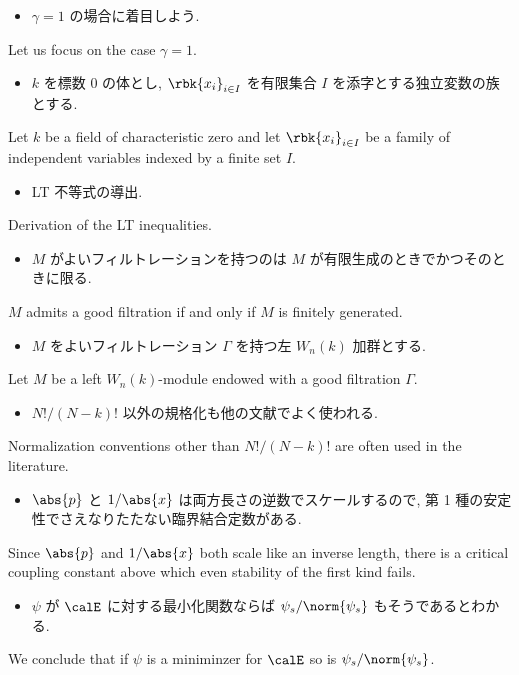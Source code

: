 \documentclass[openany, a4paper, oneside]{jsbook}
\begin{document}
\begin{itemize}
\item $\gamma = 1$ の場合に着目しよう. \cite{LiebSeiringer1}
\end{itemize}
Let us focus on the case $\gamma = 1$.

\begin{itemize}
\item $k$ を標数 $0$ の体とし, $\rbk{x_i}_{i \in I}$ を有限集合 $I$ を添字とする独立変数の族とする.
\end{itemize}
Let $k$ be a field of characteristic zero and let $\rbk{x_i}_{i \in I}$ be a family
of independent variables indexed by a finite set $I$.

\begin{itemize}
\item LT 不等式の導出. \cite{LiebSeiringer1}
\end{itemize}
Derivation of the LT inequalities.

\begin{itemize}
\item $M$ がよいフィルトレーションを持つのは $M$ が有限生成のときでかつそのときに限る.
\end{itemize}
$M$ admits a good filtration if and only if $M$ is finitely generated.

\begin{itemize}
\item $M$ をよいフィルトレーション $\Gamma$ を持つ左 $W_n (k)$ 加群とする.
\end{itemize}
Let $M$ be a left $W_n(k)$-module endowed with a good filtration $\Gamma$.

\begin{itemize}
\item $N!/(N-k)!$ 以外の規格化も他の文献でよく使われる. \cite{LiebSeiringer1}
\end{itemize}
Normalization conventions other than $N!/(N-k)!$ are often used in the literature.

\begin{itemize}
\item $\abs{p}$ と $1 / \abs{x}$ は両方長さの逆数でスケールするので, 第 1 種の安定性でさえなりたたない臨界結合定数がある. \cite{LiebSeiringer1}
\end{itemize}
Since $\abs{p}$ and $1 / \abs{x}$ both scale like an inverse length, there is a critical
coupling constant above which even stability of the first kind fails.

\begin{itemize}
\item $\psi$ が $\calE$ に対する最小化関数ならば $\psi_{s} / \norm{\psi_s}$ もそうであるとわかる. \cite{LiebSeiringer1}
\end{itemize}
We conclude that if $\psi$ is a miniminzer for $\calE$ so is $\psi_{s} / \norm{\psi_s}$.
\end{document}
